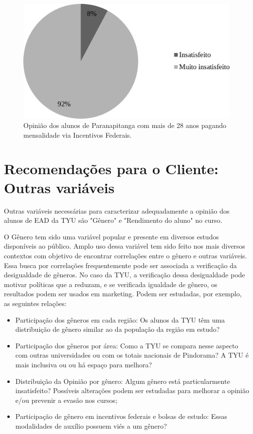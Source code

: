 \documentclass[10pt,a4paper,oneside]{article}
\newcommand{\para}{Paranapitanga\xspace}
\begin{document}
\begin{figure}[!h]
	\centering
	\includegraphics[width=.7\linewidth]{plots/q17c.pdf}
	\caption{Opinião dos alunos de \para com mais de 28 anos pagando mensalidade via Incentivos Federais.}
	\label{fig:opiniao-28anos-incFederaiso}
\end{figure}

\FloatBarrier{}
\section{Recomendações para o Cliente: Outras variáveis}
\label{section:outras-variaveis}
Outras variáveis necessárias para caracterizar adequadamente a opinião dos alunos de EAD da TYU são  "Gênero" e "Rendimento do aluno" no curso.

O Gênero tem sido uma variável popular e presente em diversos estudos disponíveis ao público. 
Amplo uso dessa variável tem sido feito nos mais diversos contextos com objetivo de encontrar correlações entre o gênero e outras variáveis. Essa busca por correlações frequentemente pode ser associada a verificação da desigualdade de gêneros. No caso da TYU, a verificação dessa desigualdade pode motivar políticas que a reduzam, e se verificada igualdade de gênero, os resultados podem ser usados em marketing. Podem ser estudadas, por exemplo, as seguintes relações:
\begin{itemize}
	\item Participação dos gêneros em cada região: Os alunos da TYU têm uma distribuição de gênero similar ao da população da região em estudo?
	\item Participação dos gêneros por área: Como a TYU se compara nesse aspecto com outras universidades ou com os totais nacionais de Pindorama? A TYU é mais inclusiva ou ou há espaço para melhora?
	\item Distribuição da Opinião por gênero: Algum gênero está particularmente insatisfeito? Possíveis alterações podem ser estudadas para melhorar a opinião e/ou prevenir a evasão nos cursos;
	\item Participação de gênero em incentivos federais e bolsas de estudo: Essas modalidades de auxílio possuem viés a um gênero?
\end{itemize}
\end{document}
